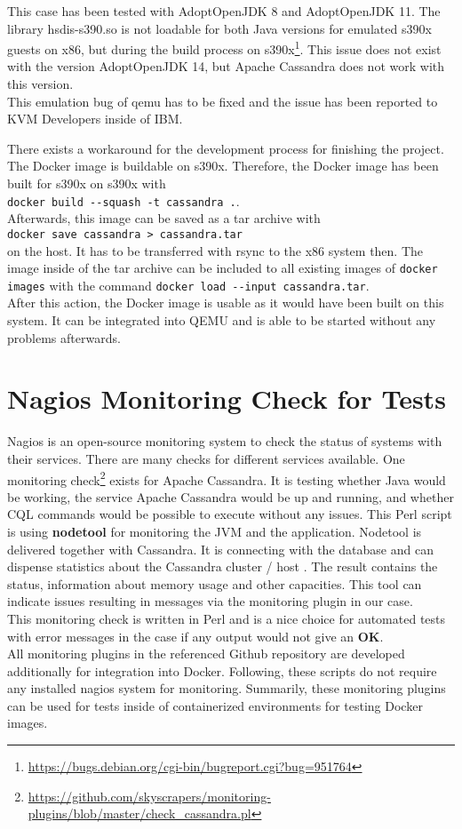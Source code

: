This case has been tested with AdoptOpenJDK 8 and AdoptOpenJDK 11. The library hsdis-s390.so is not loadable for both Java versions for emulated s390x guests on x86, but during the build process on s390x\footnote{\url{https://bugs.debian.org/cgi-bin/bugreport.cgi?bug=951764}}. This issue does not exist with the version AdoptOpenJDK 14, but Apache Cassandra does not work with this version. \\
This emulation bug of qemu has to be fixed and the issue has been reported to KVM Developers inside of IBM. 

There exists a workaround for the development process for finishing the project. The Docker image is buildable on s390x. Therefore, the Docker image has been built for s390x on s390x with \\  
\lstinline!docker build --squash -t cassandra .!. \\
Afterwards, this image can be saved as a tar archive with \\
\lstinline!docker save cassandra > cassandra.tar!\\ 
on the host. It has to be transferred with rsync to the x86 system then. The image inside of the tar archive can be included to all existing images of \lstinline!docker images! with the command 
\lstinline!docker load --input cassandra.tar!. \\
After this action, the Docker image is usable as it would have been built on this system. 
It can be integrated into QEMU and is able to be started without any problems afterwards.

\section{Nagios Monitoring Check for Tests} \label{monitoring}

Nagios is an open-source monitoring system to check the status of systems with their services. There are many checks for different services available. One monitoring check\footnote{\url{https://github.com/skyscrapers/monitoring-plugins/blob/master/check_cassandra.pl}} exists for Apache Cassandra. It is testing whether Java would be working, the service Apache Cassandra would be up and running, and whether CQL commands would be possible to execute without any issues. This Perl script is using \textbf{nodetool} for monitoring the JVM and the application. Nodetool is delivered together with Cassandra. It is connecting with the database and can dispense statistics about the Cassandra cluster / host \cite[~p.256]{Carpenter2020}. The result contains the status, information about memory usage and other capacities. This tool can indicate issues resulting in messages via the monitoring plugin in our case.\\
This monitoring check is written in Perl and is a nice choice for automated tests with error messages in the case if any output would not give an \textbf{OK}. \\
All monitoring plugins in the referenced Github repository are developed additionally for integration into Docker. Following, these scripts do not require any installed nagios system for monitoring.
Summarily, these monitoring plugins can be used for tests inside of containerized environments for testing Docker images.

